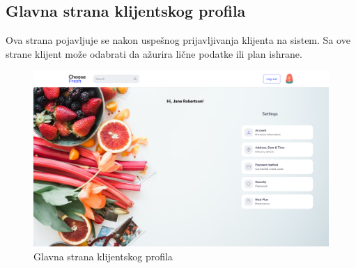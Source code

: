 \subsection{Glavna strana klijentskog profila}

Ova strana pojavljuje se nakon uspešnog prijavljivanja klijenta na sistem. Sa ove strane klijent može odabrati da ažurira lične podatke ili plan ishrane.

\begin{figure}[H]
	\begin{center}
		\includegraphics[width=\textwidth]{UI/client_home_page.png}
    		\caption{Glavna strana klijentskog profila}
    \label{fig:ClientHomePage}
    \end{center}
\end{figure}